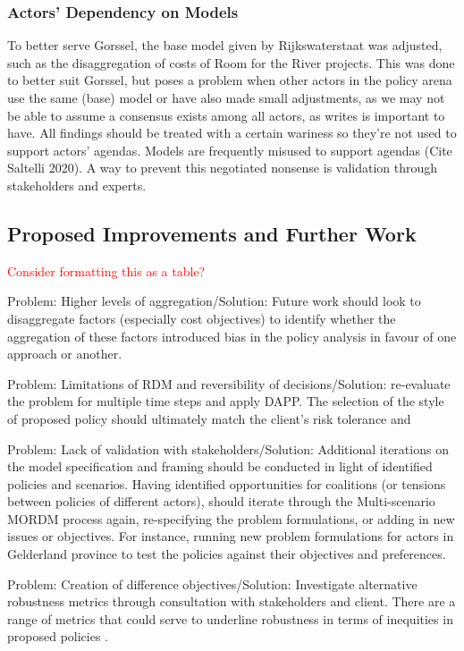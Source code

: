 \subsubsection{Actors' Dependency on Models}
To better serve Gorssel, the base model given by Rijkswaterstaat was adjusted, such as the disaggregation of costs of Room for the River projects. This was done to better suit Gorssel, but poses a problem when other actors in the policy arena use the same (base) model or have also made small adjustments, as we may not be able to assume a consensus exists among all actors, as \cite{kwakkel_coping_2016} writes is important to have. All findings should be treated with a certain wariness so they're not used to support actors' agendas. Models are frequently misused to support agendas (Cite Saltelli 2020). A way to prevent this negotiated nonsense is validation through stakeholders and experts. 

\subsection{Proposed Improvements and Further Work}

\textcolor{red}{Consider formatting this as a table?}

Problem: Higher levels of aggregation/Solution: Future work should look to disaggregate factors (especially cost objectives) to identify whether the aggregation of these factors introduced bias in the policy analysis in favour of one approach or another.

Problem: Limitations of RDM and reversibility of decisions/Solution: re-evaluate the problem for multiple time steps and apply DAPP. The selection of the style of proposed policy should ultimately match the client's risk tolerance and 

Problem: Lack of validation with stakeholders/Solution: Additional iterations on the model specification and framing should be conducted in light of identified policies and scenarios. Having identified opportunities for coalitions (or tensions between policies of different actors), should iterate through the Multi-scenario MORDM process again, re-specifying the problem formulations, or adding in new issues or objectives. For instance, running new problem formulations for actors in Gelderland province to test the policies against their objectives and preferences.

Problem: Creation of difference objectives/Solution: Investigate alternative robustness metrics through consultation with stakeholders and client. There are a range of metrics that could serve to underline robustness in terms of inequities in proposed policies \parencite{mcphail_robustness_2018}.